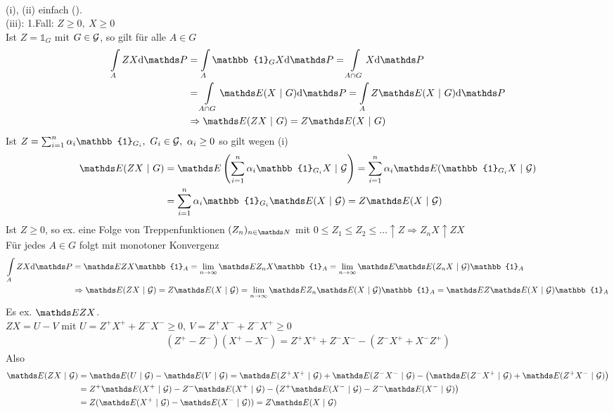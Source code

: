 \\
(i), (ii) einfach (\checkmark).\\
(iii): 1.Fall: $Z\ge 0,~X\ge0$\\
Ist $Z=\mathbb{1}_G$ mit $G\in \mathcal{G}$, so gilt für alle $A\in G$ 
\begin{equation*}
\begin{aligned}
	\int\limits_A ZX\dint \Pw &=\int\limits_A \mathbb{1}_G X\dint \Pw =\int\limits_{A\cap G}X\dint\Pw\\
	&= \int\limits_{A\cap G}\E(X~|~G)\dint\Pw =\int\limits_A Z\E(X~|~G)\dint\Pw\\
	&\Rightarrow \E(ZX~|~G)=Z\E(X~|~G)
\end{aligned}
\end{equation*}
Ist $Z=\sum_{i=1}^{n}\alpha_i \mathbb{1}_{G_i},~ G_i\in \G,~\alpha_i\ge 0$ so gilt wegen (i)
\begin{equation*}
\begin{aligned}
	\E(ZX~|~G)&=\E\enbrace{\sum_{i=1}^{n}\alpha_i\mathbb{1}_{G_i}X~|~\G}= \sum_{i=1}^{n}\alpha_i\E(\mathbb{1}_{G_i}X~|~\G)\\
	&= \sum_{i=1}^{n}\alpha_i\mathbb{1}_{G_i}\E(X~|~\G)=Z\E(X~|~\G)
\end{aligned}
\end{equation*}
Ist $Z\ge0$, so ex. eine Folge von Treppenfunktionen $(Z_n)_{n\in \N}$ mit $0\le Z_1\le Z_2\le \dots \uparrow Z \Rightarrow Z_nX\uparrow ZX$\\
Für jedes $A\in G$ folgt mit monotoner Konvergenz 
\begin{equation*}
\begin{aligned}
	\int\limits_A ZX\dint\Pw &= \E ZX\mathbb{1}_A = \lim\limits_{n\to\infty}\E Z_nX\mathbb{1}_A =\lim\limits_{n\to\infty} \E\E(Z_nX~|~\G)\mathbb{1}_A\\
	&\Rightarrow \E(ZX~|~\G)=Z\E(X~|~\G)=\lim\limits_{n\to \infty}\E Z_n\E(X~|~\G)\mathbb{1}_A=\E Z\E(X~|~\G)\mathbb{1}_A
\end{aligned}
\end{equation*}
Es ex. $\E ZX$.\\ $ZX=U-V$ mit $U=Z^+X^++Z^-X^-\ge0,~V=Z^+X^-+Z^-X^+\ge0$
\begin{equation*}
\begin{aligned}
	(Z^+-Z^-)(X^+-X^-)= Z^+X^++Z^-X^- -(Z^-X^++X^-Z^+)
\end{aligned}
\end{equation*}
Also \begin{equation*}
\begin{aligned}
	\E(ZX~|~\G) &= \E(U~|~\G)-\E(V~|~\G)= \E(Z^+X^+~|~\G)+\E(Z^-X^-~|~\G)-\big(\E(Z^-X^+~|~\G)+\E(Z^+X^-~|~\G)\big)\\
	&= Z^+\E(X^+~|~\G)-Z^-\E(X^+~|~\G)-\big(Z^+\E(X^-~|~\G)-Z^-\E(X^-~|~\G)\big)\\
	&= Z(\E(X^+~|~\G)-\E(X^-~|~\G)) = Z\E(X~|~\G)
\end{aligned}
\end{equation*}

